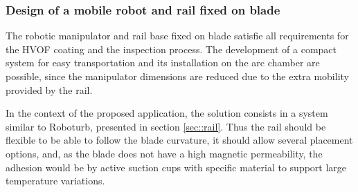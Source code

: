 \subsubsection{Design of a mobile robot and rail fixed on blade}\label{proj_rail}
The robotic manipulator and rail base fixed on blade satisfie all
requirements for the HVOF coating and the inspection process. The development of
a compact system for easy transportation and its installation on the arc
chamber are possible, since the manipulator dimensions are reduced due to the
extra mobility provided by the rail.


In the context of the proposed application, the solution consists in a system
similar to Roboturb, presented in section \ref{sec::rail}. Thus the rail should
be flexible to be able to follow the blade curvature, it should allow several placement options,
and, as the blade does not have a high magnetic permeability, the adhesion would
be by active suction cups with specific material to support large temperature
variations.



